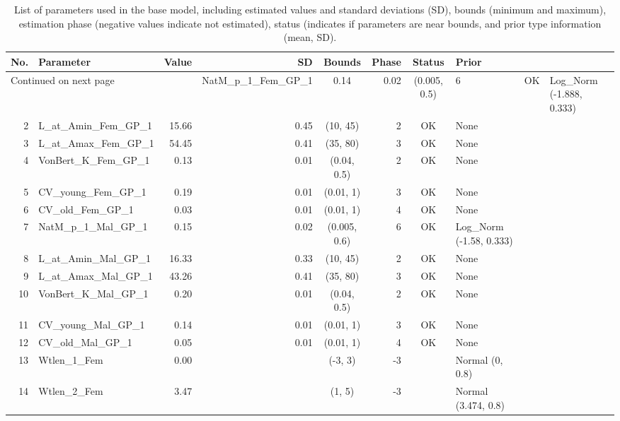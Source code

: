 \documentclass[12pt,]{article}
\begin{document}
\begin{landscape}
\begin{longtable}{rlrrcrcl}
\caption{List of parameters used in
                                              the base model, including estimated 
                                              values and standard deviations (SD), 
                                              bounds (minimum and maximum), 
                                              estimation phase (negative values indicate
                                              not estimated), status (indicates if 
                                              parameters are near bounds, and prior type
                                              information (mean, SD).} \\ 
  \hline
No. & Parameter & Value & SD & Bounds & Phase & Status & Prior \\ 
  \hline 
\endhead 
\hline 
\multicolumn{3}{l}{\footnotesize Continued on next page} 
\endfoot 
\endlastfoot 
 \hline
1 & NatM\_p\_1\_Fem\_GP\_1 & 0.14 & 0.02 & (0.005, 0.5) & 6 & OK & Log\_Norm (-1.888, 0.333) \\ 
  2 & L\_at\_Amin\_Fem\_GP\_1 & 15.66 & 0.45 & (10, 45) & 2 & OK & None \\ 
  3 & L\_at\_Amax\_Fem\_GP\_1 & 54.45 & 0.41 & (35, 80) & 3 & OK & None \\ 
  4 & VonBert\_K\_Fem\_GP\_1 & 0.13 & 0.01 & (0.04, 0.5) & 2 & OK & None \\ 
  5 & CV\_young\_Fem\_GP\_1 & 0.19 & 0.01 & (0.01, 1) & 3 & OK & None \\ 
  6 & CV\_old\_Fem\_GP\_1 & 0.03 & 0.01 & (0.01, 1) & 4 & OK & None \\ 
  7 & NatM\_p\_1\_Mal\_GP\_1 & 0.15 & 0.02 & (0.005, 0.6) & 6 & OK & Log\_Norm (-1.58, 0.333) \\ 
  8 & L\_at\_Amin\_Mal\_GP\_1 & 16.33 & 0.33 & (10, 45) & 2 & OK & None \\ 
  9 & L\_at\_Amax\_Mal\_GP\_1 & 43.26 & 0.41 & (35, 80) & 3 & OK & None \\ 
  10 & VonBert\_K\_Mal\_GP\_1 & 0.20 & 0.01 & (0.04, 0.5) & 2 & OK & None \\ 
  11 & CV\_young\_Mal\_GP\_1 & 0.14 & 0.01 & (0.01, 1) & 3 & OK & None \\ 
  12 & CV\_old\_Mal\_GP\_1 & 0.05 & 0.01 & (0.01, 1) & 4 & OK & None \\ 
  13 & Wtlen\_1\_Fem & 0.00 &  & (-3, 3) & -3 &  & Normal (0, 0.8) \\ 
  14 & Wtlen\_2\_Fem & 3.47 &  & (1, 5) & -3 &  & Normal (3.474, 0.8) \\ 

\end{longtable}
\end{landscape}
\end{document}
